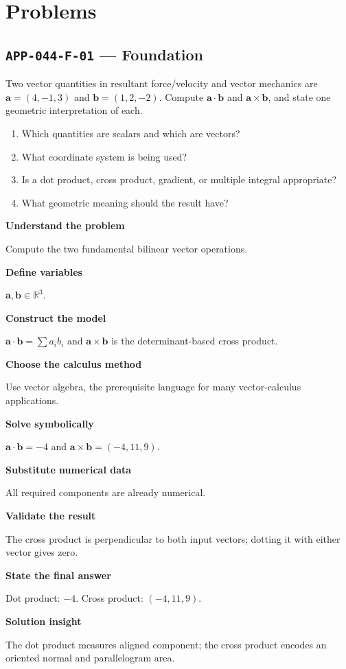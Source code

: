 \documentclass[11pt]{book}
\newcommand{\pid}[1]{\texttt{#1}}
\begin{document}
\section*{Problems}
\subsection*{\pid{APP-044-F-01} — Foundation}
\begin{problembox}
Two vector quantities in resultant force/velocity and vector mechanics are $\mathbf a=(4,-1,3)$ and $\mathbf b=(1,2,-2)$. Compute $\mathbf a\cdot\mathbf b$ and $\mathbf a\times\mathbf b$, and state one geometric interpretation of each.
\end{problembox}
\begin{promptbox}\begin{enumerate}
\item Which quantities are scalars and which are vectors?
\item What coordinate system is being used?
\item Is a dot product, cross product, gradient, or multiple integral appropriate?
\item What geometric meaning should the result have?
\end{enumerate}\end{promptbox}
\begin{solutionbox}
\textbf{Understand the problem}\par Compute the two fundamental bilinear vector operations.\par\medskip
\textbf{Define variables}\par $\mathbf a,\mathbf b\in\mathbb R^3$.\par\medskip
\textbf{Construct the model}\par $\mathbf a\cdot\mathbf b=\sum a_ib_i$ and $\mathbf a\times\mathbf b$ is the determinant-based cross product.\par\medskip
\textbf{Choose the calculus method}\par Use vector algebra, the prerequisite language for many vector-calculus applications.\par\medskip
\textbf{Solve symbolically}\par $\mathbf a\cdot\mathbf b=-4$ and $\mathbf a\times\mathbf b=(-4,11,9)$.\par\medskip
\textbf{Substitute numerical data}\par All required components are already numerical.\par\medskip
\textbf{Validate the result}\par The cross product is perpendicular to both input vectors; dotting it with either vector gives zero.\par\medskip
\textbf{State the final answer}\par Dot product: $-4$. Cross product: $(-4,11,9)$.\par\medskip
\textbf{Solution insight}\par The dot product measures aligned component; the cross product encodes an oriented normal and parallelogram area.\par\medskip
\end{solutionbox}
\end{document}
